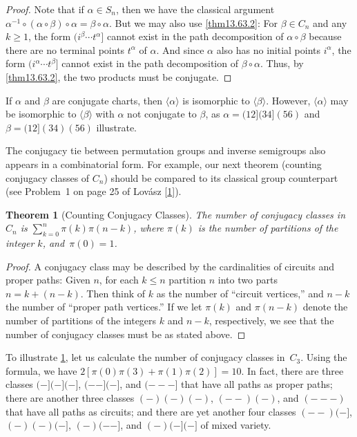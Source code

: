 \documentclass{surv-l}
\numberwithin{equation}{section}
\numberwithin{table}{section}
\numberwithin{figure}{section}
\newtheorem{theorem}[equation]{Theorem}
\theoremstyle{definition}
\begin{document}
\begin{proof} Note that if $\alpha\in S_{n}$, then we have the classical
argument $\alpha^{-1}\circ (\alpha \circ \beta)\circ\alpha=\beta
\circ\alpha$. But we may also use \ref{thm13.63.2}: For $\beta\in
C_{n}$ and any $k\geq 1$, the form $(i^{\beta}\cdots t^{\alpha}]$
cannot exist in the path decomposition of $\alpha \circ\beta$
because there are no terminal points $t^{\alpha}$ of $\alpha$. And
since $\alpha$ also has no initial points $i^{\alpha}$, the form
$(i^{\alpha}\cdots t^{\beta}]$ cannot exist in the path
decomposition of $\beta \circ\alpha$. Thus, by \ref{thm13.63.2},
the two products must be conjugate.
\end{proof}

If $\alpha$ and $\beta$ are conjugate charts, then
$\langle\alpha\rangle$ is isomorphic to $\langle\beta\rangle$.
However, $\langle\alpha\rangle$ may be isomorphic to
$\langle\beta\rangle$ with $\alpha$ not conjugate to $\beta$,
as $\alpha=(12](34](56)$ and $\beta=(12](34)(56)$ illustrate.

The conjugacy tie between permutation groups and inverse
semigroups also appears in a combinatorial form. For example,
our next theorem (counting conjugacy classes of $C_{n}$) should be
compared to its classical group counterpart (see Problem~1 on page
25 of Lov\'{a}sz
[\hyperlink{bib47}{1}]).

\begin{theorem}[Counting Conjugacy Classes]\label{thm13.63.5}
The number of conjugacy classes in $C_{n}$ is
$\sum_{k=0}^{n}\pi(k)\pi(n-k)$, where $\pi(k)$ is the number
of partitions of the integer $k$, and~$\pi(0)=1$.
\end{theorem}

\begin{proof}A conjugacy class may be described by the cardinalities of
circuits and proper paths: Given $n$, for each $k\leq n$
partition $n$ into two parts $n= k+(n-k)$. Then think of $k$
as the number of ``circuit vertices,'' and $n-k$ the number of
``proper path vertices.'' If we let $\pi(k)$ and $\pi(n-k)$
denote the number of partitions of the integers $k$ and $n-k$,
respectively, we see that the number of conjugacy classes must
be as stated above.
\end{proof}

To illustrate \ref{thm13.63.5}, let us calculate the number of
conjugacy classes in~$C_{3}$. Using the formula, we have
$2[\pi(0)\pi(3)+\pi(1)\pi(2)]=10$. In fact, there are three
classes $(-](-](-]$, $(--](-]$, and $(---]$ that have all paths
as proper paths; there are another three classes $(-)(-)(-)$,
$(--)(-)$, and $(---)$ that have all paths as circuits; and
there are yet another four classes $(--)(-]$, $(-)(-)(-]$, $(-)(--]$,
and $(-)(-](-]$ of mixed variety.
\end{document}
